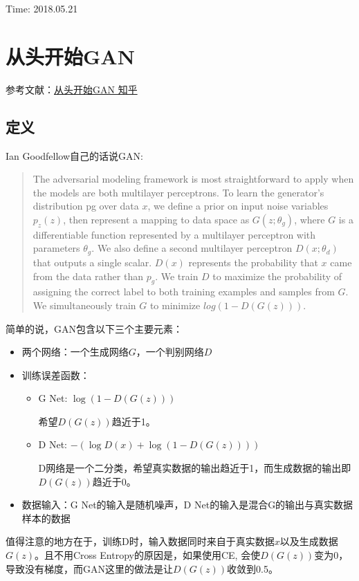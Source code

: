 {\color{red} Time: 2018.05.21}

\section{从头开始GAN}

参考文献：\href{https://zhuanlan.zhihu.com/p/27012520}{从头开始GAN 知乎}

\subsection{定义}

Ian Goodfellow自己的话说GAN\cite{Goodfellow2014GAN}:
\begin{quote}
The adversarial modeling framework is most straightforward to apply when the models are both
multilayer perceptrons. To learn the generator’s distribution pg over data $x$, we define a prior on
input noise variables $p_z(z)$, then represent a mapping to data space as $G(z; θ_g)$, where $G$ is a
differentiable function represented by a multilayer perceptron with parameters $θ_g$. We also define a
second multilayer perceptron $D(x; θ_d)$ that outputs a single scalar. $D(x)$ represents the probability
that $x$ came from the data rather than $p_g$. We train $D$ to maximize the probability of assigning the
correct label to both training examples and samples from $G$. We simultaneously train $G$ to minimize
$log(1 − D(G(z)))$.
\end{quote}

简单的说，GAN包含以下三个主要元素：
\begin{itemize}
\item 两个网络：一个生成网络$G$，一个判别网络$D$
\item 训练误差函数：
\begin{itemize}
\item G Net: $\log (1 - D(G(z)))$

希望$D(G(z))$趋近于1。

\item D Net: $-(\log D(x) + \log(1 - D(G(z))))$

D网络是一个二分类，希望真实数据的输出趋近于1，而生成数据的输出即$D(G(z))$趋近于0。

\end{itemize}
\item 数据输入：G Net的输入是随机噪声，D Net的输入是混合G的输出与真实数据样本的数据
\end{itemize}


值得注意的地方在于，训练D时，输入数据同时来自于真实数据$x$以及生成数据$G(z)$。且不用Cross Entropy的原因是，如果使用CE, 会使$D(G(z))$变为0，导致没有梯度，而GAN这里的做法是让$D(G(z))$收敛到0.5。


